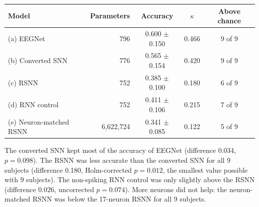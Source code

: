 \documentclass[10pt,letterpaper]{article}
\newcommand{\sect}[1]{\par\vspace{3pt}{\large\bfseries #1}\par\vspace{-1pt}}
\begin{document}
\sect{Results}
\begin{minipage}[t]{0.53\linewidth}\vspace{0pt}
\footnotesize\setlength{\tabcolsep}{3.5pt}
\begin{tabular}{@{}lrccc@{}}
\toprule
Model & Parameters & Accuracy & $\kappa$ & Above chance \\
\midrule
(a) EEGNet                & 796       & 0.600 $\pm$ 0.150 & 0.466 & 9 of 9 \\
(b) Converted SNN         & 776       & 0.565 $\pm$ 0.154 & 0.420 & 9 of 9 \\
(c) RSNN                  & 752       & 0.385 $\pm$ 0.100 & 0.180 & 6 of 9 \\
(d) RNN control           & 752       & 0.411 $\pm$ 0.106 & 0.215 & 7 of 9 \\
(e) Neuron-matched RSNN   & 6,622,724 & 0.341 $\pm$ 0.085 & 0.122 & 5 of 9 \\
\bottomrule
\end{tabular}

\vspace{5pt}\fontsize{9.7}{11.6}\selectfont
The converted SNN kept most of the accuracy of EEGNet (difference 0.034, $p = 0.098$). The RSNN was less accurate than
the converted SNN for all 9 subjects (difference 0.180, Holm-corrected $p = 0.012$, the smallest value possible with
9 subjects). The non-spiking RNN control was only slightly above the RSNN (difference 0.026, uncorrected $p = 0.074$).
More neurons did not help: the neuron-matched RSNN was below the 17-neuron RSNN for all 9 subjects.
\end{minipage}\hfill
\end{document}
